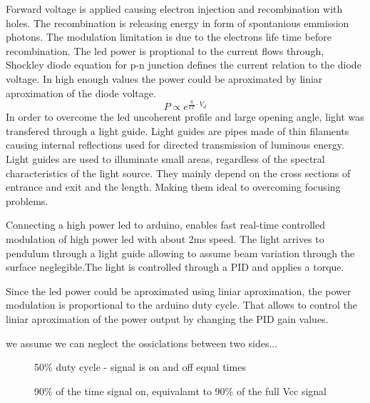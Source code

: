 \documentclass[\main/master.tex]{subfiles}
\begin{document}
\par\noindent
Forward voltage is applied causing electron injection and recombination with holes. The recombination is releasing energy in form of spontanious emmission photons. The modulation limitation is due to the electrons life time before recombination. The led power is proptional to the current flows through, Shockley diode equation for p-n junction defines the current relation to the diode voltage. In high enough values the power could be aproximated by liniar aproximation of the diode voltage.
\begin{equation}
P\propto e^{\frac{q}{kT}\cdot V_d}\label{eqn:energy-mass-equivalence-relation}
\end{equation}
In order to overcome the led uncoherent profile and large opening angle, light was transfered through a light guide. Light guides are pipes made of thin filaments causing internal reflections used for directed transmission of luminous energy. Light guides are used to illuminate small areas, regardless of the spectral characteristics of the light source. They mainly depend on the cross sections of entrance and exit and the length. Making them ideal to overcoming focusing problems.
\par\noindent
Connecting a high power led to arduino, enables fast real-time controlled modulation of high power led with about 2ms speed. The light arrives to pendulum through a light guide allowing to assume beam variation through the surface neglegible.The light is controlled through a PID and applies a torque.
\par\noindent
Since the led power could be aproximated using liniar aproximation, the power modulation is proportional to the arduino duty cycle. That allows to control the liniar aproximation of the power output by changing the PID gain values.  
\par\noindent
we assume we can neglect the ossiclations between two sides...



\begin{figure}[htbp]
	\centering
	\caption[duty cycle 50\%]{50\% duty cycle  - signal is on and off equal times}
	\label{fig:duty50}
\end{figure}
 
\begin{figure}[htbp]
	\centering
	\caption[duty cycle 90\%]{90\% of the time signal on, equivalamt to 90\% of the full Vcc signal}
	\label{fig:duty90}
\end{figure}
\end{document}
